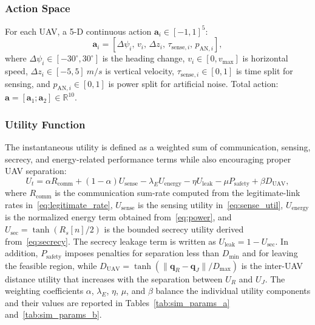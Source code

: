 \documentclass[journal]{IEEEtran}
\begin{document}
\subsubsection{Action Space}
For each UAV, a 5-D continuous action $\mathbf{a}_i \in [-1, 1]^5$:
\begin{equation}
\mathbf{a}_i = [\Delta \psi_i,\, v_i,\, \Delta z_i,\, \tau_{\text{sense}, i},\, p_{\text{AN}, i}],
\label{eq:action}
\end{equation}
where $\Delta \psi_i \in [-30^\circ, 30^\circ]$ is the heading change, $v_i \in [0, v_{\max}]$ is horizontal speed, $\Delta z_i \in [-5, 5]~\si{m/s}$ is vertical velocity, $\tau_{\text{sense}, i} \in [0, 1]$ is time split for sensing, and $p_{\text{AN}, i} \in [0, 1]$ is power split for artificial noise. Total action: $\mathbf{a} = [\mathbf{a}_1; \mathbf{a}_2] \in \mathbb{R}^{10}$.

\subsubsection{Utility Function}
The instantaneous utility is defined as a weighted sum of communication, sensing, secrecy, and energy-related performance terms while also encouraging proper UAV separation:
\begin{equation}
U_t = \alpha R_{\text{comm}} + (1-\alpha) U_{\text{sense}} - \lambda_E U_{\text{energy}} - \eta U_{\text{leak}} - \mu P_{\text{safety}} + \beta D_{\text{UAV}},
\label{eq:reward}
\end{equation}
where $R_{\text{comm}}$ is the communication sum-rate computed from the legitimate-link rates in~\eqref{eq:legitimate_rate}, $U_{\text{sense}}$ is the sensing utility in~\eqref{eq:sense_util}, $U_{\text{energy}}$ is the normalized energy term obtained from~\eqref{eq:power}, and $U_{\text{sec}}=\tanh(R_s[n]/2)$ is the bounded secrecy utility derived from~\eqref{eq:secrecy}. The secrecy leakage term is written as $U_{\text{leak}} = 1 - U_{\text{sec}}$. In addition, $P_{\text{safety}}$ imposes penalties for separation less than $D_{\min}$ and for leaving the feasible region, while $D_{\text{UAV}} = \tanh(\|\mathbf{q}_R - \mathbf{q}_J\|/D_{\max})$ is the inter-UAV distance utility that increases with the separation between $U_R$ and $U_J$. The weighting coefficients $\alpha$, $\lambda_E$, $\eta$, $\mu$, and $\beta$ balance the individual utility components and their values are reported in Tables~\ref{tab:sim_params_a} and~\ref{tab:sim_params_b}.
\end{document}
